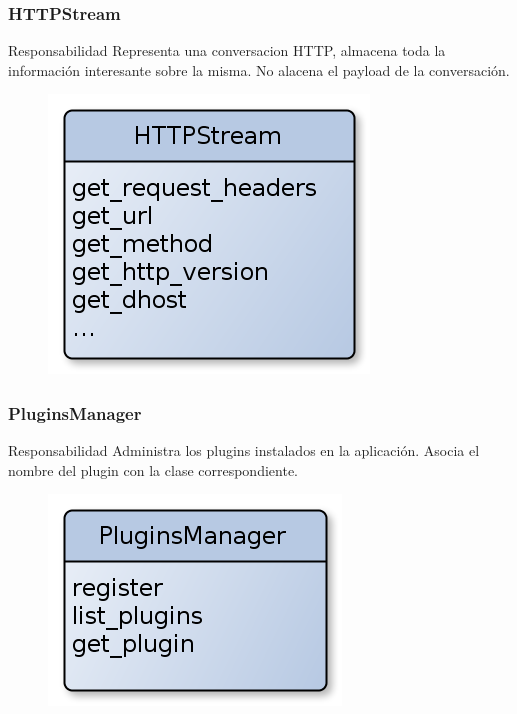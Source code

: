 \documentclass[10pt,a4paper]{beamer}
\begin{document}
\begin{frame}

	\frametitle{HTTPStream}
	\begin{block}{Responsabilidad}
		Representa una conversacion HTTP, almacena toda la información interesante sobre la misma. No alacena el payload de la conversación.
	\end{block}
	\begin{figure}[hbtp]
		\includegraphics[scale=0.40]{img/HTTPStream.png} 
	\end{figure}
\end{frame}


\begin{frame}

	\frametitle{PluginsManager}
	\begin{block}{Responsabilidad}
		Administra los plugins instalados en la aplicación. Asocia el nombre del plugin con la clase correspondiente. 
	\end{block}
	\begin{figure}[hbtp]
		\includegraphics[scale=0.40]{img/PluginsManager.png} 
	\end{figure}
\end{frame}
\end{document}
